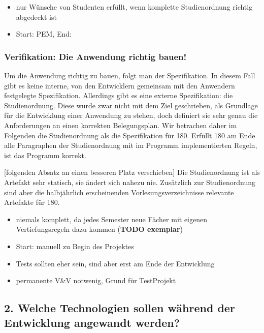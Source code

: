 \documentclass[]{article}
\begin{document}
\begin{itemize}
\itemsep1pt\parskip0pt
\item
  nur Wünsche von Studenten erfüllt, wenn komplette Studienordnung
  richtig abgedeckt ist
\item
  Start: PEM, End:
\end{itemize}

\subsubsection{Verifikation: Die Anwendung richtig
bauen!}\label{verifikation-die-anwendung-richtig-bauen}

Um die Anwendung richtig zu bauen, folgt man der Spezifikation. In
diesem Fall gibt es keine interne, von den Entwicklern gemeinsam mit den
Anwendern festgelegte Spezifikation. Allerdings gibt es eine externe
Spezifikation: die Studienordnung. Diese wurde zwar nicht mit dem Ziel
geschrieben, als Grundlage für die Entwicklung einer Anwendung zu
stehen, doch definiert sie sehr genau die Anforderungen an einen
korrekten Belegungsplan. Wir betrachen daher im Folgenden die
Studienordnung als die Spezifikation für 180. Erfüllt 180 am Ende alle
Paragraphen der Studienordnung mit im Programm implementierten Regeln,
ist das Programm korrekt.

{[}folgenden Absatz an einen besseren Platz verschieben{]} Die
Studienordnung ist als Artefakt sehr statisch, sie ändert sich nahezu
nie. Zusätzlich zur Studienordnung sind aber die halbjährlich
erscheinenden Vorlesungsverzeichnisse relevante Artefakte für 180.

\begin{itemize}
\item
  niemals komplett, da jedes Semester neue Fächer mit eigenen
  Vertiefungsregeln dazu kommen (\textbf{TODO exemplar})
\item
  Start: manuell zu Begin des Projektes
\item
  Tests sollten eher sein, sind aber erst am Ende der Entwicklung
\item
  permanente V\&V notwenig, Grund für TestProjekt
\end{itemize}

\subsection{2. Welche Technologien sollen während der Entwicklung
angewandt
werden?}\label{welche-technologien-sollen-wuxe4hrend-der-entwicklung-angewandt-werden}
\end{document}
